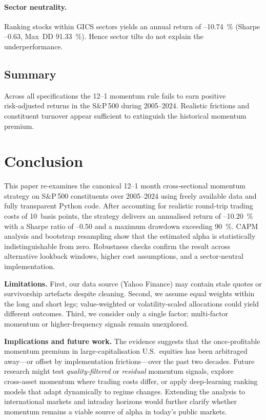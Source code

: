 \documentclass[11pt]{article}
\begin{document}
\paragraph{Sector neutrality.}
Ranking stocks within GICS sectors yields an annual return of --10.74~\% (Sharpe --0.63, Max DD 91.33~\%).  
Hence sector tilts do not explain the underperformance.

\subsection{Summary}

Across all specifications the 12--1 momentum rule fails to earn positive risk‑adjusted returns in the S\&P\,500 during 2005--2024.  
Realistic frictions and constituent turnover appear sufficient to extinguish the historical momentum premium.

\section{Conclusion} \label{sec:concl}
This paper re‑examines the canonical 12--1 month cross‑sectional momentum strategy on S\&P\,500 constituents over 2005--2024 using freely available data and fully transparent Python code.  
After accounting for realistic round‑trip trading costs of 10~basis points, the strategy delivers an annualised return of --10.20~\% with a Sharpe ratio of --0.50 and a maximum drawdown exceeding 90~\%.  
CAPM analysis and bootstrap resampling show that the estimated alpha is statistically indistinguishable from zero.  
Robustness checks confirm the result across alternative lookback windows, higher cost assumptions, and a sector‑neutral implementation.

\textbf{Limitations.}  
First, our data source (Yahoo Finance) may contain stale quotes or survivorship artefacts despite cleaning.  
Second, we assume equal weights within the long and short legs; value‑weighted or volatility‑scaled allocations could yield different outcomes.  
Third, we consider only a single factor; multi‑factor momentum or higher‑frequency signals remain unexplored.

\textbf{Implications and future work.}  
The evidence suggests that the once‑profitable momentum premium in large‑capitalisation U.S.\ equities has been arbitraged away—or offset by implementation frictions—over the past two decades.  
Future research might test \emph{quality‑filtered} or \emph{residual} momentum signals, explore cross‑asset momentum where trading costs differ, or apply deep‑learning ranking models that adapt dynamically to regime changes.  
Extending the analysis to international markets and intraday horizons would further clarify whether momentum remains a viable source of alpha in today’s public markets.



\end{document}
